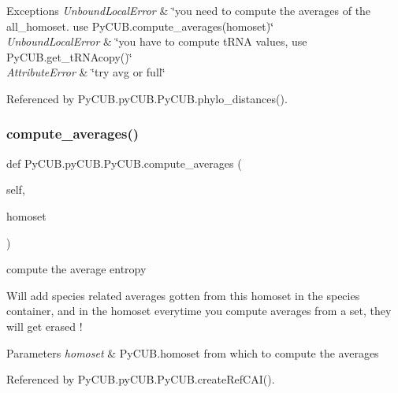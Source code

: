 \begin{DoxyExceptions}{Exceptions}
{\em Unbound\+Local\+Error} & \char`\"{}you need to compute the averages of the all\+\_\+homoset. use Py\+C\+U\+B.\+compute\+\_\+averages(homoset)\char`\"{} \\
\hline
{\em Unbound\+Local\+Error} & \char`\"{}you have to compute t\+R\+N\+A values, use Py\+C\+U\+B.\+get\+\_\+t\+R\+N\+Acopy()\char`\"{} \\
\hline
{\em Attribute\+Error} & \char`\"{}try avg or full\char`\"{} \\
\hline
\end{DoxyExceptions}


Referenced by Py\+C\+U\+B.\+py\+C\+U\+B.\+Py\+C\+U\+B.\+phylo\+\_\+distances().

\mbox{\label{class_py_c_u_b_1_1py_c_u_b_1_1_py_c_u_b_a9526c0d10381daf5abc8ea120454e701}} 
\subsubsection{\texorpdfstring{compute\+\_\+averages()}{compute\_averages()}}
{\footnotesize\ttfamily def Py\+C\+U\+B.\+py\+C\+U\+B.\+Py\+C\+U\+B.\+compute\+\_\+averages (\begin{DoxyParamCaption}\item[{}]{self,  }\item[{}]{homoset }\end{DoxyParamCaption})}



compute the average entropy 

Will add species related averages gotten from this homoset in the species container, and in the homoset everytime you compute averages from a set, they will get erased !


\begin{DoxyParams}{Parameters}
{\em homoset} & Py\+C\+U\+B.\+homoset from which to compute the averages \\
\hline
\end{DoxyParams}


Referenced by Py\+C\+U\+B.\+py\+C\+U\+B.\+Py\+C\+U\+B.\+create\+Ref\+C\+A\+I().

